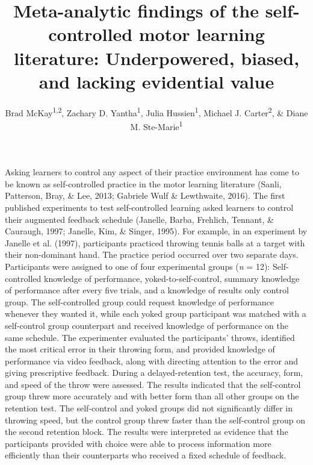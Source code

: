 \documentclass[
  english,
  man,floatsintext]{apa7}
\title{Meta-analytic findings of the self-controlled motor learning literature: Underpowered, biased, and lacking evidential value}
\author{Brad McKay\textsuperscript{1,2}, Zachary D. Yantha\textsuperscript{1}, Julia Hussien\textsuperscript{1}, Michael J. Carter\textsuperscript{2}, \& Diane M. Ste-Marie\textsuperscript{1}}
\date{}
\affiliation{\vspace{0.5cm}\textsuperscript{1} School of Human Kinetics University of Ottawa\\\textsuperscript{2} Department of Kinesiology McMaster University}
\begin{document}
\maketitle

Asking learners to control any aspect of their practice environment has come to be known as self-controlled practice in the motor learning literature (Sanli, Patterson, Bray, \& Lee, 2013; Gabriele Wulf \& Lewthwaite, 2016). The first published experiments to test self-controlled learning asked learners to control their augmented feedback schedule (Janelle, Barba, Frehlich, Tennant, \& Cauraugh, 1997; Janelle, Kim, \& Singer, 1995). For example, in an experiment by Janelle et al. (1997), participants practiced throwing tennis balls at a target with their non-dominant hand. The practice period occurred over two separate days. Participants were assigned to one of four experimental groups (\emph{n} = 12): Self-controlled knowledge of performance, yoked-to-self-control, summary knowledge of performance after every five trials, and a knowledge of results only control group. The self-controlled group could request knowledge of performance whenever they wanted it, while each yoked group participant was matched with a self-control group counterpart and received knowledge of performance on the same schedule. The experimenter evaluated the participants' throws, identified the most critical error in their throwing form, and provided knowledge of performance via video feedback, along with directing attention to the error and giving prescriptive feedback. During a delayed-retention test, the accuracy, form, and speed of the throw were assessed. The results indicated that the self-control group threw more accurately and with better form than all other groups on the retention test. The self-control and yoked groups did not significantly differ in throwing speed, but the control group threw faster than the self-control group on the second retention block. The results were interpreted as evidence that the participants provided with choice were able to process information more efficiently than their counterparts who received a fixed schedule of feedback.
\end{document}
